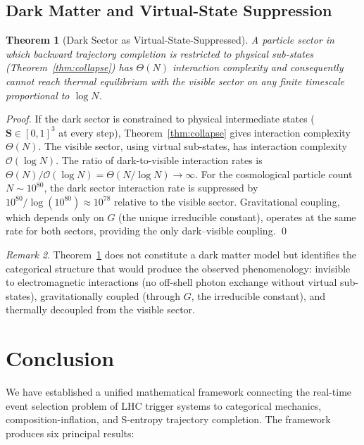 \documentclass[twocolumn,10pt,a4paper]{article}
\theoremstyle{thmstyle}
\newtheorem{theorem}{Theorem}[section]
\theoremstyle{definition}
\theoremstyle{remark}
\newtheorem{remark}[theorem]{Remark}
\begin{document}
\subsection{Dark Matter and Virtual-State Suppression}

\begin{theorem}[Dark Sector as Virtual-State-Suppressed]
\label{thm:dark-matter}
A particle sector in which backward trajectory completion is restricted
to physical sub-states (Theorem~\ref{thm:collapse}) has $\Theta(N)$
interaction complexity and consequently cannot reach thermal
equilibrium with the visible sector on any finite timescale proportional
to $\log N$.
\end{theorem}

\begin{proof}
If the dark sector is constrained to physical intermediate states
($\mathbf{S} \in [0,1]^3$ at every step), Theorem~\ref{thm:collapse}
gives interaction complexity $\Theta(N)$. The visible sector, using
virtual sub-states, has interaction complexity $\mathcal{O}(\log N)$.
The ratio of dark-to-visible interaction rates is $\Theta(N)/
\mathcal{O}(\log N) = \Theta(N/\log N) \to \infty$. For the
cosmological particle count $N \sim 10^{80}$, the dark sector
interaction rate is suppressed by $10^{80}/\log(10^{80}) \approx
10^{78}$ relative to the visible sector. Gravitational coupling, which
depends only on $G$ (the unique irreducible constant), operates at
the same rate for both sectors, providing the only dark--visible
coupling. \qed
\end{proof}

\begin{remark}
Theorem~\ref{thm:dark-matter} does not constitute a dark matter model
but identifies the categorical structure that would produce the
observed phenomenology: invisible to electromagnetic interactions
(no off-shell photon exchange without virtual sub-states),
gravitationally coupled (through $G$, the irreducible constant),
and thermally decoupled from the visible sector.
\end{remark}

\section{Conclusion}
\label{sec:conclusion}

We have established a unified mathematical framework connecting the
real-time event selection problem of LHC trigger systems to categorical
mechanics, composition-inflation, and S-entropy trajectory completion.
The framework produces six principal results:
\end{document}
